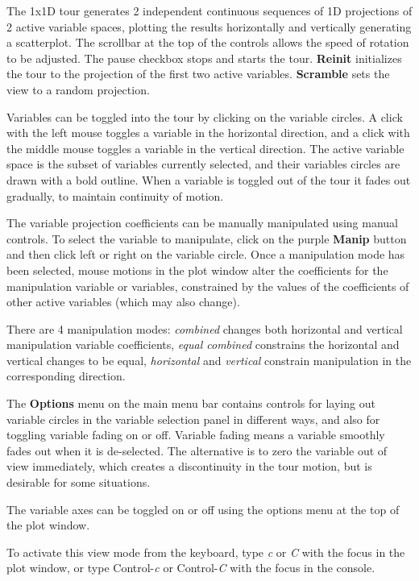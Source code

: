 \documentclass[11pt]{article}
\begin{document}
The 1x1D tour generates 2 independent continuous sequences of 1D
projections of 2 active variable spaces, plotting the results
horizontally and vertically generating a scatterplot. The scrollbar at
the top of the controls allows the speed of rotation to be
adjusted. The pause checkbox stops and starts the tour. {\bf Reinit}
initializes the tour to the projection of the first two active
variables. {\bf Scramble} sets the view to a random projection.

Variables can be toggled into the tour by clicking on the variable
circles. A click with the left mouse toggles a variable in the horizontal
direction, and a click with the middle mouse toggles a variable in
the vertical direction. The active variable space is the subset of
variables currently selected, and their variables circles are drawn with
a bold outline. When a variable is toggled out of the tour it fades out
gradually, to maintain continuity of motion.

The variable projection coefficients can be manually manipulated using
manual controls. To select the variable to manipulate, click on the purple
{\bf Manip} button and then click left or right on the variable circle.
Once a manipulation mode has been selected, mouse motions in the plot
window alter the coefficients for the manipulation variable or variables,
constrained by the values of the coefficients of other active variables
(which may also change).

There are 4 manipulation modes: {\it combined} changes both horizontal
and vertical manipulation variable coefficients, {\it equal combined}
constrains the horizontal and vertical changes to be equal, {\it
horizontal} and {\it vertical} constrain manipulation in the corresponding
direction.

The {\bf Options} menu on the main menu bar contains controls for
laying out variable circles in the variable selection panel in
different ways, and also for toggling variable fading on or
off. Variable fading means a variable smoothly fades out when it is
de-selected. The alternative is to zero the variable out of view
immediately, which creates a discontinuity in the tour motion, but is
desirable for some situations.

The variable axes can be toggled on or off using the options menu at
the top of the plot window.

To activate this view mode from the keyboard, type {\em c} or {\em C}
with the focus in the plot window, or type Control-{\em c} or
Control-{\em C} with the focus in the console.
\end{document}
